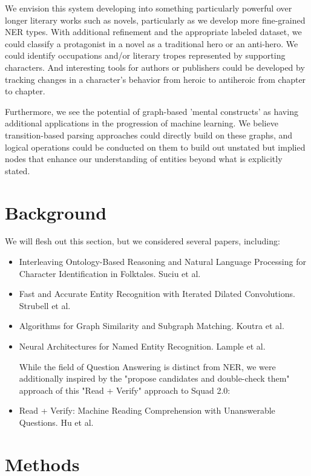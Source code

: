 \documentclass[11pt,a4paper]{article}
\begin{document}
We envision this system developing into something particularly powerful over longer literary works such as novels, particularly as we develop more fine-grained NER types. With additional refinement and the appropriate labeled dataset, we could classify a protagonist in a novel as a traditional hero or an anti-hero. We could identify occupations and/or literary tropes represented by supporting characters. And interesting tools for authors or publishers could be developed by tracking changes in a character's behavior from heroic to antiheroic from chapter to chapter.

Furthermore, we see the potential of graph-based 'mental constructs' as having additional applications in the progression of machine learning. We believe transition-based parsing approaches could directly build on these graphs, and logical operations could be conducted on them to build out unstated but implied nodes that enhance our understanding of entities beyond what is explicitly stated.

\section{Background}

We will flesh out this section, but we considered several papers, including:
\begin{itemize}
\item Interleaving Ontology-Based Reasoning and Natural Language Processing for Character Identification in Folktales. Suciu et al.

\item Fast and Accurate Entity Recognition with Iterated Dilated Convolutions. Strubell et al.

\item Algorithms for Graph Similarity and Subgraph Matching. Koutra et al.

\item Neural Architectures for Named Entity Recognition. Lample et al.

While the field of Question Answering is distinct from NER, we were additionally inspired by the "propose candidates and double-check them" approach of this "Read + Verify" approach to Squad 2.0:

\item Read + Verify: Machine Reading Comprehension with Unanswerable Questions. Hu et al.
\end{itemize}

\section{Methods}
\end{document}

